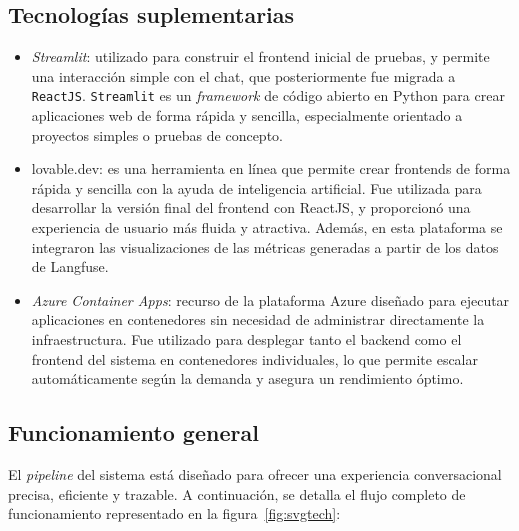 \subsection{Tecnologías suplementarias}

\begin{itemize}
    \item \textit{Streamlit}: utilizado para construir el frontend inicial de pruebas, y permite una interacción simple con el chat, que posteriormente fue migrada a \texttt{ReactJS}. \texttt{Streamlit} es un \textit{framework} de código abierto en Python para crear aplicaciones web de forma rápida y sencilla, especialmente orientado a proyectos simples o pruebas de concepto.

    \item lovable.dev: es una herramienta en línea que permite crear frontends de forma rápida y sencilla con la ayuda de inteligencia artificial. Fue utilizada para desarrollar la versión final del frontend con ReactJS, y proporcionó una experiencia de usuario más fluida y atractiva. Además, en esta plataforma se integraron las visualizaciones de las métricas generadas a partir de los datos de Langfuse.

    \item \textit{Azure Container Apps}: recurso de la plataforma Azure diseñado para ejecutar aplicaciones en contenedores sin necesidad de administrar directamente la infraestructura. Fue utilizado para desplegar tanto el backend como el frontend del sistema en contenedores individuales, lo que permite escalar automáticamente según la demanda y asegura un rendimiento óptimo.

\end{itemize}

\subsection{Funcionamiento general} 

El \textit{pipeline} del sistema está diseñado para ofrecer una experiencia conversacional precisa, eficiente y trazable. A continuación, se detalla el flujo completo de funcionamiento representado en la figura~\ref{fig:svgtech}:

